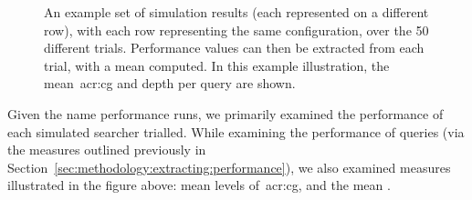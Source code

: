 
\begin{figure}[t!]
    \centering
    \caption[Computation of average measures]{An example set of simulation results (each represented on a different row), with each row representing the same configuration, over the 50 different trials. Performance values can then be extracted from each trial, with a mean computed. In this example illustration, the mean~\gls{acr:cg} and depth per query are shown.}
    \label{fig:example_sim_configuration}
\end{figure}

Given the name performance runs, we primarily examined the performance of each simulated searcher trialled. While examining the performance of queries (via the measures outlined previously in Section~\ref{sec:methodology:extracting:performance}), we also examined measures illustrated in the figure above: mean levels of~\gls{acr:cg}, and the mean .

